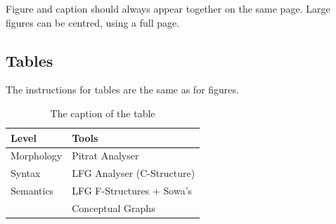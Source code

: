 \documentclass[10pt, a4paper]{article}
\begin{document}
Figure and caption should always appear together on the same page. Large figures
can be centred, using a full page.

\subsection{Tables}

The instructions for tables are the same as for figures.
%
\begin{table}[!h]
\begin{center}
\begin{tabularx}{\columnwidth}{|l|X|}

      \hline
      Level&Tools\\
      \hline
      Morphology & Pitrat Analyser\\
      \hline
      Syntax & LFG Analyser (C-Structure)\\
      \hline
     Semantics & LFG F-Structures + Sowa's\\
     & Conceptual Graphs\\
      \hline

\end{tabularx}
\caption{The caption of the table}
 \end{center}
\end{table}

%
%
%
%
%
\end{document}
